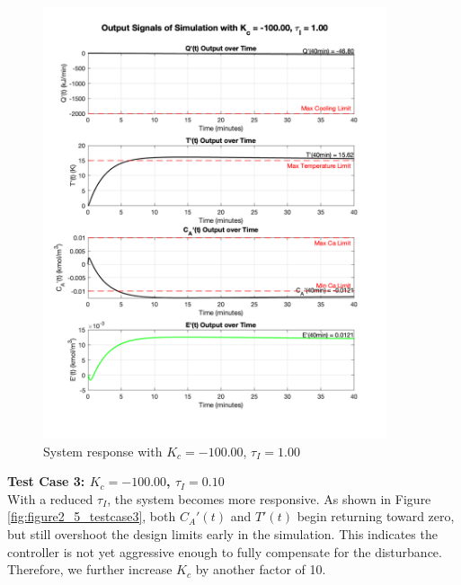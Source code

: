 \documentclass[12pt]{article}
\begin{document}
\begin{enumerate}
\begin{enumerate}
    \begin{figure}[H]
      \centering
      \includegraphics[width=0.900\textwidth]{Figures/figure2_5_testcase2.png}
      \caption{System response with $K_c = -100.00$, $\tau_I = 1.00$}
      \label{fig:figure2_5_testcase2}
    \end{figure}
    
    \clearpage
    \textbf{Test Case 3: $K_c = -100.00$, $\tau_I = 0.10$} \\
    With a reduced $\tau_I$, the system becomes more responsive. As shown in Figure \ref{fig:figure2_5_testcase3}, both $C_A'(t)$ and $T'(t)$ begin returning toward zero, but still overshoot the design limits early in the simulation. This indicates the controller is not yet aggressive enough to fully compensate for the disturbance. Therefore, we further increase $K_c$ by another factor of 10.
    

\end{enumerate}
\end{enumerate}
\end{document}
